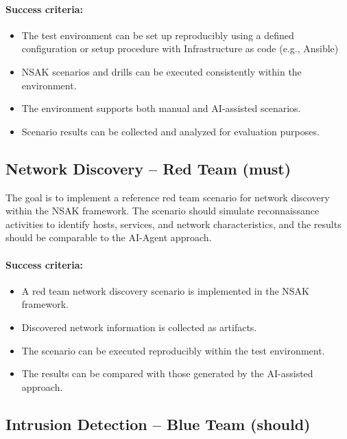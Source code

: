 \paragraph{Success criteria:}

\begin{itemize}
	\item The test environment can be set up reproducibly using a defined configuration or setup procedure with Infrastructure as code (e.g., Ansible)
	\item \gls{NSAK} scenarios and drills can be executed consistently within the environment.
	\item The environment supports both manual and \gls{AI}-assisted scenarios.
	\item Scenario results can be collected and analyzed for evaluation purposes.
\end{itemize}
\newpage

\subsection{Network Discovery -- Red Team (must)}\label{subsec:network-discovery-red-team}

The goal is to implement a reference red team scenario for network discovery within the \gls{NSAK} framework.
The scenario should simulate reconnaissance activities to identify hosts, services, and network characteristics, and the results should be comparable to the \gls{AI}-Agent approach.

\paragraph{Success criteria:}

\begin{itemize}
	\item A red team network discovery scenario is implemented in the \gls{NSAK} framework.
	\item Discovered network information is collected as artifacts.
	\item The scenario can be executed reproducibly within the test environment.
	\item The results can be compared with those generated by the \gls{AI}-assisted approach.
\end{itemize}

\subsection{Intrusion Detection -- Blue Team (should)}\label{subsec:intrusion-detection-blue-team}


